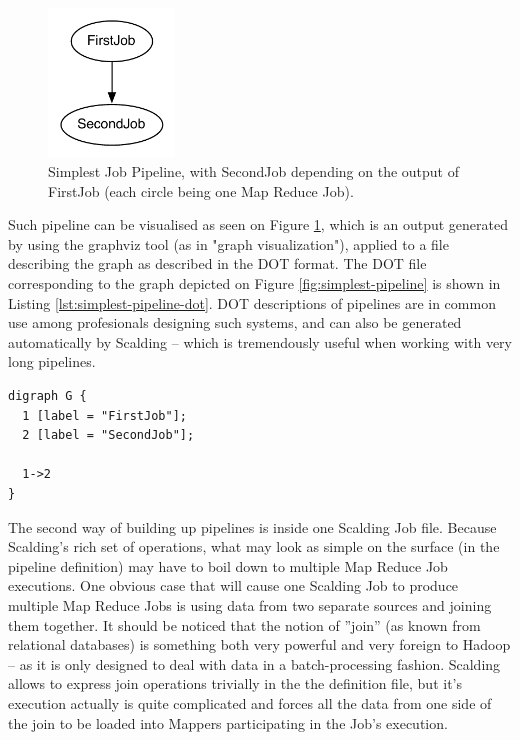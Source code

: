 \begin{figure}[ch!]
  \centering
  \includegraphics[width=0.3\textwidth]{img/simplest-pipeline}
  \caption{Simplest Job Pipeline, with SecondJob depending on the output of FirstJob (each circle being one Map Reduce Job).}
  \label{fig:simplect-pipeline}
\end{figure}

Such pipeline can be visualised as seen on Figure \ref{fig:simplect-pipeline}, which is an output generated by using the graphviz tool (as in "graph visualization"), applied to a file describing the graph as described in the DOT format. The DOT file corresponding to the graph depicted on Figure \ref{fig:simplest-pipeline} is shown in Listing \ref{lst:simplest-pipeline-dot}. DOT descriptions of pipelines are in common use among profesionals designing such systems, and can also be generated automatically by Scalding -- which is tremendously useful when working with very long pipelines.

\begin{lstlisting}[caption={Textual description of graph on Figure \ref{fig:simplect-pipeline}, using the DOT graph description language.}, label={lst:simplest-pipeline-dot}]
digraph G {
  1 [label = "FirstJob"];
  2 [label = "SecondJob"];
  
  1->2
}
\end{lstlisting}

The second way of building up pipelines is inside one Scalding Job file. Because Scalding's rich set of operations, what may look as simple on the surface (in the pipeline definition) may have to boil down to multiple Map Reduce Job executions. One obvious case that will cause one Scalding Job to produce multiple Map Reduce Jobs is using data from two separate sources and joining them together. It should be noticed that the notion of ''join'' (as known from relational databases) is something both very powerful and very foreign to Hadoop -- as it is only designed to deal with data in a batch-processing fashion. Scalding allows to express join operations trivially in the the definition file, but it's execution actually is quite complicated and forces all the data from one side of the join to be loaded into Mappers participating in the Job's execution.

